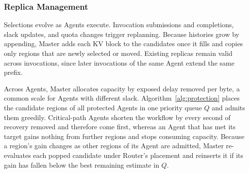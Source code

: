 \subsubsection{Replica Management}
\label{sec:master-online}
\label{sec:execution}

Selections evolve as Agents execute. Invocation submissions and
completions, slack updates, and quota changes trigger replanning.
Because histories grow by appending, Master adds each KV block to the
candidates once it fills and copies only regions that are newly selected
or moved. Existing replicas
remain valid across invocations, since later invocations of the same
Agent extend the same prefix.

Across Agents, Master allocates capacity by exposed delay removed per
byte, a common scale for Agents with different slack.
Algorithm~\ref{alg:protection} places the candidate regions of all
protected Agents in one priority queue $Q$ and admits them greedily.
Critical-path Agents shorten the workflow by every second of recovery
removed and therefore come first, whereas an Agent that has met its
target gains nothing from further regions and stops consuming capacity.
Because a region's gain changes as other regions of its Agent are
admitted, Master re-evaluates each popped candidate under Router's
placement and reinserts it if its gain has fallen below the best
remaining estimate in $Q$.

